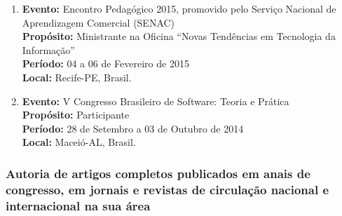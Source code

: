 \documentclass[a4paper,oneside,10pt]{article}
\begin{document}
\begin{enumerate}
\item   \textbf{Evento:} Encontro Pedagógico 2015, promovido pelo Serviço Nacional de Aprendizagem Comercial (SENAC) \mbox{} \\
        \textbf{Propósito:} Ministrante na Oficina ``Novas Tendências em Tecnologia da Informação''\\
        \textbf{Período:} 04 a 06 de Fevereiro de 2015\\
        \textbf{Local:} Recife-PE, Brasil.

\item   \textbf{Evento:} V Congresso Brasileiro de Software: Teoria e Prática \mbox{} \\
        \textbf{Propósito:} Participante\\
        \textbf{Período:} 28 de Setembro a 03 de Outubro de 2014\\
        \textbf{Local:} Macei\'{o}-AL, Brasil.

\end{enumerate}

\subsubsection{Autoria de artigos completos publicados em anais de congresso, em jornais e revistas de circulação nacional e internacional na sua área}
\vspace{0.3cm}
\end{document}
